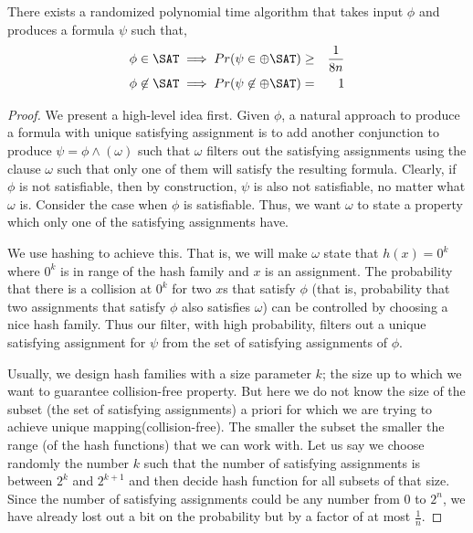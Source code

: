 \documentclass[11pt]{article}
\begin{document}
\begin{corollary}
There exists a randomized polynomial time algorithm that takes input $\phi$ and produces a formula $\psi$ such that,
\begin{eqnarray*}
\phi \in \SAT \implies Pr(\psi \in \oplus\SAT) & \geq &  \frac{1}{8n} \\
\phi \not\in \SAT \implies Pr (\psi \not\in \oplus\SAT) & = & 1
\end{eqnarray*}
\end{corollary}

\begin{proof}
We present a high-level idea first. Given $\phi$, a natural approach to produce a formula with unique satisfying assignment is to add another conjunction to produce $\psi = \phi \land (\omega)$ such that $\omega$ 
filters out the satisfying assignments using the clause $\omega$ such that only one of them will satisfy the resulting formula. Clearly, if $\phi$ is not satisfiable, then by construction, $\psi$ is also not satisfiable, no matter what $\omega$ is. Consider the case when $\phi$ is satisfiable. Thus, we want $\omega$ to state a property which only one of the satisfying assignments have. 

We use hashing to achieve this. That is, we will make $\omega$ state that $h(x) = 0^k$ where $0^k$ is in range of the hash family and $x$ is an assignment. The probability that there is a collision at $0^k$ for two $x$s that satisfy $\phi$ (that is, probability that two assignments that satisfy $\phi$ also satisfies $\omega$) can be controlled by choosing a nice hash family. Thus our filter, with high probability, filters out a unique satisfying assignment for $\psi$ from the set of satisfying assignments of $\phi$.

Usually, we design hash families with a size parameter $k$; the size up to which we want to guarantee collision-free property. But here we do not know the size of the subset (the set of satisfying assignments) a priori for which we are trying to achieve unique mapping(collision-free). The smaller the subset the smaller the range (of the hash functions) that we can work with. Let us say we choose randomly the number $k$ such that the number of satisfying assignments is between $2^k$ and $2^{k+1}$ and then decide hash function for all subsets of that size. Since the number of satisfying assignments could be any number from $0$ to $2^n$, we have already lost out a bit on the probability but by a factor of at most $\frac{1}{n}$.


\end{proof}
\end{document}
